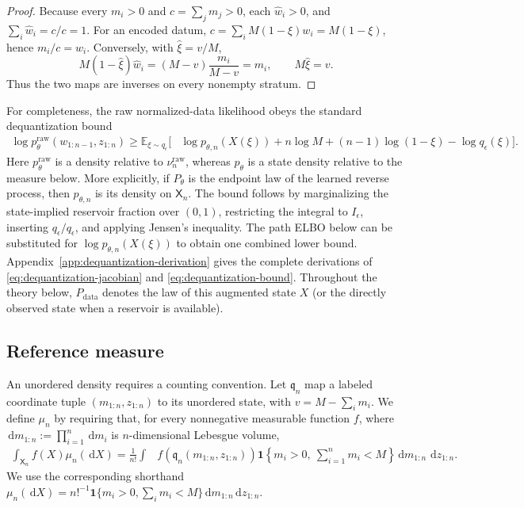 \documentclass[10pt]{article}
\theoremstyle{definition}
\theoremstyle{remark}
\newcommand{\E}{\mathbb{E}}
\newcommand{\dd}{\,\mathrm{d}}
\newcommand{\ind}{\mathbf{1}}
\newcommand{\state}{\mathsf{X}}
\newcommand{\pdata}{P_{\mathrm{data}}}
\begin{document}
\begin{proof}
Because every $m_i>0$ and $c=\sum_jm_j>0$, each $\widehat w_i>0$, and
$\sum_i\widehat w_i=c/c=1$.  For an encoded datum,
$c=\sum_iM(1-\xi)w_i=M(1-\xi)$, hence
$m_i/c=w_i$.  Conversely, with $\widehat\xi=v/M$,
\[
  M(1-\widehat\xi)\widehat w_i
  =(M-v)\frac{m_i}{M-v}=m_i,
  \qquad M\widehat\xi=v.
\]
Thus the two maps are inverses on every nonempty stratum.
\end{proof}

For completeness, the raw normalized-data likelihood obeys the standard
dequantization bound
\begin{align}
  \log p_\theta^{\mathrm{raw}}(w_{1:n-1},z_{1:n})
  \geq \E_{\xi\sim q_\epsilon}\big[&
    \log p_{\theta,n}(X(\xi))
    +n\log M+(n-1)\log(1-\xi)
    -\log q_\epsilon(\xi)\big].
  \label{eq:dequantization-bound}
\end{align}
Here $p_\theta^{\mathrm{raw}}$ is a density relative to
$\nu_n^{\mathrm{raw}}$, whereas $p_\theta$ is a state density relative to
the measure below.  More explicitly, if $P_\theta$ is the endpoint law of
the learned reverse process, then $p_{\theta,n}$ is its density on
$\state_n$.  The bound follows by marginalizing the state-implied
reservoir fraction over $(0,1)$, restricting the integral to
$I_\epsilon$, inserting $q_\epsilon/q_\epsilon$, and applying Jensen's
inequality.  The path ELBO
below can be substituted for $\log p_{\theta,n}(X(\xi))$ to obtain one combined
lower bound.
Appendix~\ref{app:dequantization-derivation} gives the complete derivations
of \eqref{eq:dequantization-jacobian} and
\eqref{eq:dequantization-bound}.
Throughout the theory below, $\pdata$ denotes the law of this augmented
state $X$ (or the directly observed state when a reservoir is available).

\subsection{Reference measure}

An unordered density requires a counting convention.  Let
$\mathfrak q_n$ map a labeled coordinate tuple $(m_{1:n},z_{1:n})$ to its unordered
state, with $v=M-\sum_i m_i$.  We define $\mu_n$ by requiring that, for
every nonnegative measurable function $f$, where
$\dd m_{1:n}:=\prod_{i=1}^n\dd m_i$ is $n$-dimensional Lebesgue volume,
\begin{align}
  \int_{\state_n}f(X)\mu_n(\dd X)
  =\frac{1}{n!}\int
  &f\!\left(\mathfrak q_n(m_{1:n},z_{1:n})\right)
  \ind\!\left\{m_i>0,\ \sum_{i=1}^{n}m_i<M\right\}
  \dd m_{1:n}\,\dd z_{1:n}.
  \label{eq:reference-measure}
\end{align}
We use the corresponding shorthand
$\mu_n(\dd X)=n!^{-1}\ind\{m_i>0,\sum_i m_i<M\}
\dd m_{1:n}\dd z_{1:n}$.
\end{document}
